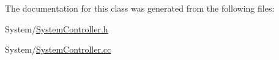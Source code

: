 The documentation for this class was generated from the following files\-:\begin{DoxyCompactItemize}
\item 
System/\hyperlink{_system_controller_8h}{System\-Controller.\-h}\item 
System/\hyperlink{_system_controller_8cc}{System\-Controller.\-cc}\end{DoxyCompactItemize}
